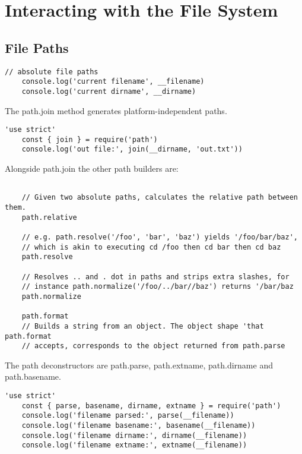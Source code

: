 \documentclass{scrartcl}
\begin{document}
\section{Interacting with the File System}
\subsection{File Paths}

\begin{lstlisting}[style=ES6]
    // absolute file paths
    console.log('current filename', __filename)
    console.log('current dirname', __dirname)
\end{lstlisting}

The path.join method generates platform-independent paths.

\begin{lstlisting}[style=ES6]
    'use strict'
    const { join } = require('path')
    console.log('out file:', join(__dirname, 'out.txt'))
\end{lstlisting}

Alongside path.join the other path builders are:



\begin{lstlisting}[style=ES6]

    // Given two absolute paths, calculates the relative path between them.
    path.relative

    // e.g. path.resolve('/foo', 'bar', 'baz') yields '/foo/bar/baz',
    // which is akin to executing cd /foo then cd bar then cd baz
    path.resolve

    // Resolves .. and . dot in paths and strips extra slashes, for
    // instance path.normalize('/foo/../bar//baz') returns '/bar/baz
    path.normalize

    path.format
    // Builds a string from an object. The object shape 'that path.format
    // accepts, corresponds to the object returned from path.parse
\end{lstlisting}

The path deconstructors are path.parse, path.extname, path.dirname and path.basename.

\begin{lstlisting}[style=ES6]
    'use strict'
    const { parse, basename, dirname, extname } = require('path')
    console.log('filename parsed:', parse(__filename))
    console.log('filename basename:', basename(__filename))
    console.log('filename dirname:', dirname(__filename))
    console.log('filename extname:', extname(__filename))
\end{lstlisting}
\end{document}
